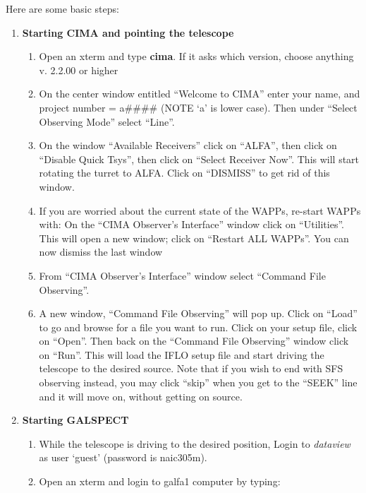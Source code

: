 Here are some basic steps:

\begin{enumerate}

\item {\bf Starting CIMA and pointing the telescope}

\begin{enumerate}
\item Open an xterm and type {\bf cima}. If it asks which version,
choose anything v. 2.2.00 or higher
\item On the center window entitled ``Welcome to CIMA''
enter your name, and project number = a\#\#\#\# (NOTE `a' is lower
case). Then under ``Select Observing Mode'' select ``Line''.
\item On the window ``Available Receivers''
click on ``ALFA'', then click on ``Disable Quick Tsys'', then click on
``Select Receiver Now''.
This will start rotating the turret to ALFA. Click on ``DISMISS'' to
get rid of this window.

\item If you are worried about the current state of the WAPPs, re-start WAPPs with:
On the ``CIMA Observer's Interface'' window click on ``Utilities''.
This will open a new window; click on ``Restart ALL WAPPs''. You can now dismiss the last window

\item From ``CIMA Observer's Interface'' window select ``Command File
Observing''. 

\item A new window, ``Command File Observing'' will pop up.
Click on ``Load'' to go and browse for a file you want to
run. Click on your setup file, click on ``Open''.
Then back on  the ``Command File Observing'' window
click on ``Run''. 
This will load the IFLO setup file and start driving the telescope to
the desired source. Note that if you wish to end with SFS observing instead, you may click ``skip'' when you get to the ``SEEK'' line and it will move on, without getting on source.

\end{enumerate}


\item {\bf Starting GALSPECT}

\begin{enumerate}
\item While the telescope is driving to the desired position, 
Login to {\it dataview} as user `guest' (password is naic305m). 

\item Open an xterm and login to galfa1 computer by typing:


\end{enumerate}
\end{enumerate}
